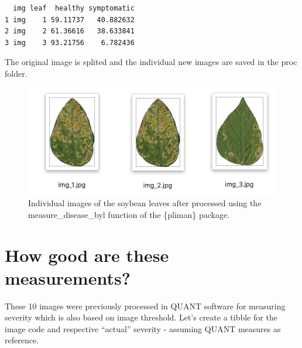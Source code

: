 \documentclass[
  letterpaper,
]{book}
\newenvironment{Shaded}{\begin{snugshade}}{\end{snugshade}}
\newcommand{\NormalTok}[1]{\textcolor[rgb]{0.00,0.23,0.31}{#1}}
\newcommand{\SpecialCharTok}[1]{\textcolor[rgb]{0.37,0.37,0.37}{#1}}
\begin{document}
\begin{Shaded}
\end{Shaded}

\begin{verbatim}
  img leaf  healthy symptomatic
1 img    1 59.11737   40.882632
2 img    2 61.36616   38.633841
3 img    3 93.21756    6.782436
\end{verbatim}

The original image is splited and the individual new images are saved in
the proc folder.

\begin{figure}

{\centering \includegraphics[width=5.26042in,height=\textheight]{imgs/sbr_procor.png}

}

\caption{Individual images of the soybean leaves after processed using
the measure\_disease\_byl function of the \{pliman\} package.}

\end{figure}

\hypertarget{how-good-are-these-measurements}{%
\section{How good are these
measurements?}\label{how-good-are-these-measurements}}

These 10 images were previously processed in QUANT software for
measuring severity which is also based on image threshold. Let's create
a tibble for the image code and respective ``actual'' severity -
assuming QUANT measures as reference.
\end{document}
